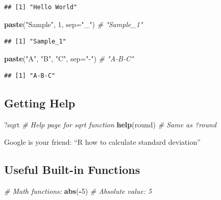 \documentclass[
]{article}
\newenvironment{Shaded}{\begin{snugshade}}{\end{snugshade}}
\newcommand{\AttributeTok}[1]{\textcolor[rgb]{0.13,0.29,0.53}{#1}}
\newcommand{\CommentTok}[1]{\textcolor[rgb]{0.56,0.35,0.01}{\textit{#1}}}
\newcommand{\DecValTok}[1]{\textcolor[rgb]{0.00,0.00,0.81}{#1}}
\newcommand{\FunctionTok}[1]{\textcolor[rgb]{0.13,0.29,0.53}{\textbf{#1}}}
\newcommand{\NormalTok}[1]{#1}
\newcommand{\SpecialCharTok}[1]{\textcolor[rgb]{0.81,0.36,0.00}{\textbf{#1}}}
\newcommand{\StringTok}[1]{\textcolor[rgb]{0.31,0.60,0.02}{#1}}
\begin{document}
\begin{verbatim}
## [1] "Hello World"
\end{verbatim}

\begin{Shaded}
\begin{Highlighting}[]
\FunctionTok{paste}\NormalTok{(}\StringTok{"Sample"}\NormalTok{, }\DecValTok{1}\NormalTok{, }\AttributeTok{sep=}\StringTok{"\_"}\NormalTok{)                }\CommentTok{\# "Sample\_1"}
\end{Highlighting}
\end{Shaded}

\begin{verbatim}
## [1] "Sample_1"
\end{verbatim}

\begin{Shaded}
\begin{Highlighting}[]
\FunctionTok{paste}\NormalTok{(}\StringTok{"A"}\NormalTok{, }\StringTok{"B"}\NormalTok{, }\StringTok{"C"}\NormalTok{, }\AttributeTok{sep=}\StringTok{"{-}"}\NormalTok{)              }\CommentTok{\# "A{-}B{-}C"}
\end{Highlighting}
\end{Shaded}

\begin{verbatim}
## [1] "A-B-C"
\end{verbatim}

\subsection{Getting Help}\label{getting-help}

\begin{Shaded}
\begin{Highlighting}[]
\NormalTok{?sqrt              }\CommentTok{\# Help page for sqrt function}
\FunctionTok{help}\NormalTok{(round)        }\CommentTok{\# Same as ?round}
\end{Highlighting}
\end{Shaded}

Google is your friend: ``R how to calculate standard deviation''

\subsection{Useful Built-in Functions}\label{useful-built-in-functions}

\begin{Shaded}
\begin{Highlighting}[]
\CommentTok{\# Math functions:}
\FunctionTok{abs}\NormalTok{(}\SpecialCharTok{{-}}\DecValTok{5}\NormalTok{)            }\CommentTok{\# Absolute value: 5}
\end{Highlighting}
\end{Shaded}
\end{document}
